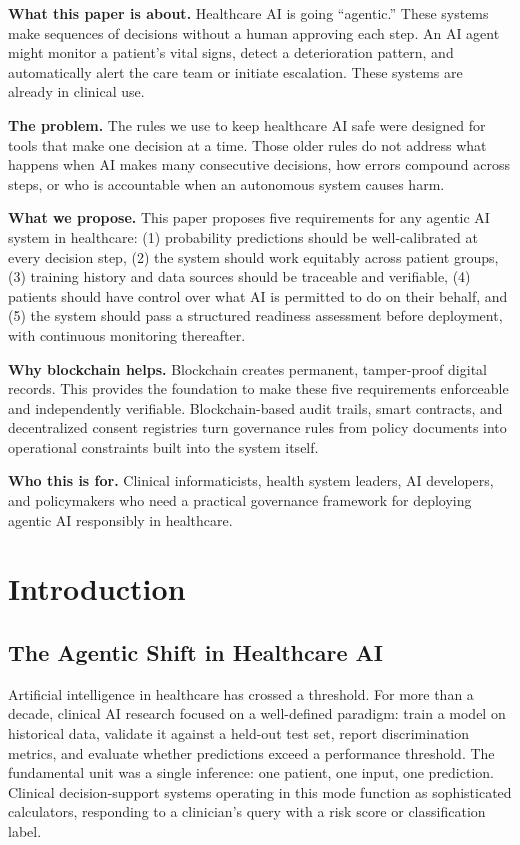 \documentclass[11pt]{article}
\begin{document}
\textbf{What this paper is about.} Healthcare AI is going ``agentic.''
These systems make sequences of decisions without a human approving each
step. An AI agent might monitor a patient's vital signs, detect a
deterioration pattern, and automatically alert the care team or initiate
escalation. These systems are already in clinical use.

\textbf{The problem.} The rules we use to keep healthcare AI safe were
designed for tools that make one decision at a time. Those older rules
do not address what happens when AI makes many consecutive decisions,
how errors compound across steps, or who is accountable when an
autonomous system causes harm.

\textbf{What we propose.} This paper proposes five requirements for any
agentic AI system in healthcare: (1) probability predictions should be
well-calibrated at every decision step, (2) the system should work
equitably across patient groups, (3) training history and data sources
should be traceable and verifiable, (4) patients should have control
over what AI is permitted to do on their behalf, and (5) the system
should pass a structured readiness assessment before deployment, with
continuous monitoring thereafter.

\textbf{Why blockchain helps.} Blockchain creates permanent,
tamper-proof digital records. This provides the foundation to make these
five requirements enforceable and independently verifiable.
Blockchain-based audit trails, smart contracts, and decentralized
consent registries turn governance rules from policy documents into
operational constraints built into the system itself.

\textbf{Who this is for.} Clinical informaticists, health system
leaders, AI developers, and policymakers who need a practical governance
framework for deploying agentic AI responsibly in healthcare.


\section{Introduction}\label{introduction}

\subsection{The Agentic Shift in Healthcare
AI}\label{the-agentic-shift-in-healthcare-ai}

Artificial intelligence in healthcare has crossed a threshold. For more
than a decade, clinical AI research focused on a well-defined paradigm:
train a model on historical data, validate it against a held-out test
set, report discrimination metrics, and evaluate whether predictions
exceed a performance threshold. The fundamental unit was a single
inference: one patient, one input, one prediction. Clinical
decision-support systems operating in this mode function as
sophisticated calculators, responding to a clinician's query with a risk
score or classification label.
\end{document}
